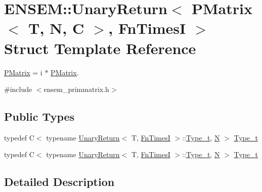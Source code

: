 \hypertarget{structENSEM_1_1UnaryReturn_3_01PMatrix_3_01T_00_01N_00_01C_01_4_00_01FnTimesI_01_4}{}\section{E\+N\+S\+EM\+:\+:Unary\+Return$<$ P\+Matrix$<$ T, N, C $>$, Fn\+TimesI $>$ Struct Template Reference}
\label{structENSEM_1_1UnaryReturn_3_01PMatrix_3_01T_00_01N_00_01C_01_4_00_01FnTimesI_01_4}


\mbox{\hyperlink{classENSEM_1_1PMatrix}{P\+Matrix}} = i $\ast$ \mbox{\hyperlink{classENSEM_1_1PMatrix}{P\+Matrix}}.  




{\ttfamily \#include $<$ensem\+\_\+primmatrix.\+h$>$}

\subsection*{Public Types}
\begin{DoxyCompactItemize}
\item 
typedef C$<$ typename \mbox{\hyperlink{structENSEM_1_1UnaryReturn}{Unary\+Return}}$<$ T, \mbox{\hyperlink{structENSEM_1_1FnTimesI}{Fn\+TimesI}} $>$\+::\mbox{\hyperlink{structENSEM_1_1UnaryReturn_3_01PMatrix_3_01T_00_01N_00_01C_01_4_00_01FnTimesI_01_4_aab89467172d831a392a305ca7f49772e}{Type\+\_\+t}}, \mbox{\hyperlink{operator__name__util_8cc_a7722c8ecbb62d99aee7ce68b1752f337}{N}} $>$ \mbox{\hyperlink{structENSEM_1_1UnaryReturn_3_01PMatrix_3_01T_00_01N_00_01C_01_4_00_01FnTimesI_01_4_aab89467172d831a392a305ca7f49772e}{Type\+\_\+t}}
\item 
typedef C$<$ typename \mbox{\hyperlink{structENSEM_1_1UnaryReturn}{Unary\+Return}}$<$ T, \mbox{\hyperlink{structENSEM_1_1FnTimesI}{Fn\+TimesI}} $>$\+::\mbox{\hyperlink{structENSEM_1_1UnaryReturn_3_01PMatrix_3_01T_00_01N_00_01C_01_4_00_01FnTimesI_01_4_aab89467172d831a392a305ca7f49772e}{Type\+\_\+t}}, \mbox{\hyperlink{operator__name__util_8cc_a7722c8ecbb62d99aee7ce68b1752f337}{N}} $>$ \mbox{\hyperlink{structENSEM_1_1UnaryReturn_3_01PMatrix_3_01T_00_01N_00_01C_01_4_00_01FnTimesI_01_4_aab89467172d831a392a305ca7f49772e}{Type\+\_\+t}}
\end{DoxyCompactItemize}


\subsection{Detailed Description}
